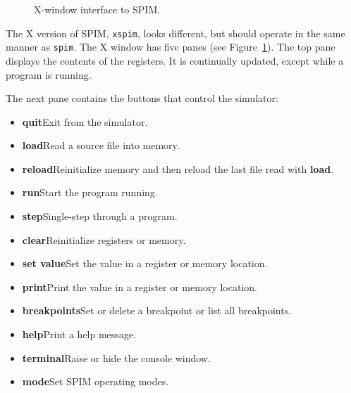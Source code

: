 \documentclass[11pt]{article}
\begin{document}
\begin{figure}
  \centerline{}
  \caption{X-window interface to SPIM.}
  \label{fig:xinterface}
\end{figure}
The X version of SPIM, {\tt xspim}, looks different, but should
operate in the same manner as {\tt spim}.  The X window has five panes
(see Figure~\ref{fig:xinterface}).  The top pane displays the contents
of the registers.  It is continually updated, except while a program
is running.

The next pane contains the buttons that control the simulator:
\begin{itemize}
  \item [] {\bf quit}\newline Exit from the simulator.

  \item [] {\bf load}\newline Read a source file into memory.

  \item [] {\bf reload}\newline Reinitialize memory and then reload the
last file read with {\bf load}.

  \item [] {\bf run}\newline Start the program running.

  \item [] {\bf step}\newline Single-step through a program.

  \item [] {\bf clear}\newline Reinitialize registers or memory.

  \item [] {\bf set value}\newline Set the value in a register or
memory location.

  \item [] {\bf print}\newline Print the value in a register or memory
location.

  \item [] {\bf breakpoints}\newline Set or delete a breakpoint or list
all breakpoints.

  \item [] {\bf help}\newline Print a help message.

  \item [] {\bf terminal}\newline Raise or hide the console window.

  \item [] {\bf mode}\newline Set SPIM operating modes.
\end{itemize}
\end{document}
